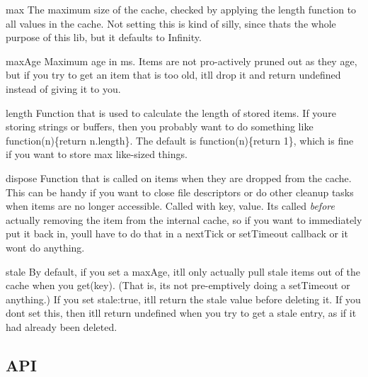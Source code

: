 \begin{DoxyItemize}
\item {\ttfamily max} The maximum size of the cache, checked by applying the length function to all values in the cache. Not setting this is kind of silly, since that\textquotesingle{}s the whole purpose of this lib, but it defaults to {\ttfamily Infinity}.
\item {\ttfamily max\+Age} Maximum age in ms. Items are not pro-\/actively pruned out as they age, but if you try to get an item that is too old, it\textquotesingle{}ll drop it and return undefined instead of giving it to you.
\item {\ttfamily length} Function that is used to calculate the length of stored items. If you\textquotesingle{}re storing strings or buffers, then you probably want to do something like {\ttfamily function(n)\{return n.\+length\}}. The default is {\ttfamily function(n)\{return 1\}}, which is fine if you want to store {\ttfamily max} like-\/sized things.
\item {\ttfamily dispose} Function that is called on items when they are dropped from the cache. This can be handy if you want to close file descriptors or do other cleanup tasks when items are no longer accessible. Called with {\ttfamily key, value}. It\textquotesingle{}s called {\itshape before} actually removing the item from the internal cache, so if you want to immediately put it back in, you\textquotesingle{}ll have to do that in a {\ttfamily next\+Tick} or {\ttfamily set\+Timeout} callback or it won\textquotesingle{}t do anything.
\item {\ttfamily stale} By default, if you set a {\ttfamily max\+Age}, it\textquotesingle{}ll only actually pull stale items out of the cache when you {\ttfamily get(key)}. (That is, it\textquotesingle{}s not pre-\/emptively doing a {\ttfamily set\+Timeout} or anything.) If you set {\ttfamily stale\+:true}, it\textquotesingle{}ll return the stale value before deleting it. If you don\textquotesingle{}t set this, then it\textquotesingle{}ll return {\ttfamily undefined} when you try to get a stale entry, as if it had already been deleted.
\end{DoxyItemize}

\subsection*{A\+P\+I}


